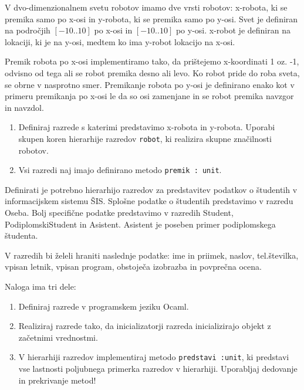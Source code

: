 \begin{ex}
V dvo-dimenzionalnem svetu robotov imamo dve vrsti robotov: x-robota, ki se premika samo po x-osi in y-robota, ki se premika samo po y-osi. Svet je definiran na podro\v cjih $[-10..10]$ po x-osi in $[-10..10]$ po y-osi. x-robot je definiran na lokaciji, ki je na y-osi, medtem ko ima y-robot lokacijo na x-osi. 

Premik robota po x-osi implementiramo tako, da pri\v stejemo x-koordinati 1 oz. -1, odvisno od tega ali se robot premika desno ali levo. Ko robot pride do roba sveta, se obrne v nasprotno smer. Premikanje robota po y-osi je definirano enako kot v primeru premikanja po x-osi le da so osi zamenjane in se robot premika navzgor in navzdol.

\begin{enumerate}
\item Definiraj razrede s katerimi predstavimo x-robota in y-robota. Uporabi skupen koren hierarhije razredov \lstinline{robot}, ki realizira skupne zna\v cilnosti robotov.

\item Vsi razredi naj imajo definirano metodo \lstinline{premik : unit}. 
\end{enumerate}

\end{ex} 





\begin{ex}
Definirati je potrebno hierarhijo razredov za predstavitev podatkov o \v studentih v informacijskem sistemu \v SIS. Splo\v sne podatke o \v studentih predstavimo v razredu Oseba. Bolj specifi\v cne podatke predstavimo v razredih Student, PodiplomskiStudent in Asistent.
Asistent je poseben primer podiplomskega \v studenta. 

V razredih bi \v zeleli hraniti naslednje podatke: ime in priimek, naslov, tel.\v stevilka, vpisan letnik, vpisan program, obstoje\v ca izobrazba in povpre\v cna ocena. 

Naloga ima tri dele:

\begin{enumerate}
\item Definiraj razrede v programskem jeziku Ocaml.

\item Realiziraj razrede tako, da inicializatorji razreda inicializirajo objekt z za\v cetnimi vrednostmi.

\item V hierarhiji razredov implementiraj metodo \lstinline{predstavi :unit}, ki predstavi vse lastnosti poljubnega primerka razredov v hierarhiji. Uporabljaj dedovanje in prekrivanje metod!
\end{enumerate}
\end{ex}




